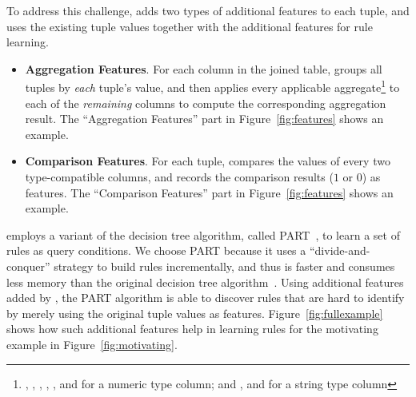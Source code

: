 To address this challenge, \ourtool adds two types of
additional features to each tuple, and uses
the existing tuple values together with the additional features
for rule learning.

\begin{itemize}

\item {\textbf{Aggregation Features}}. For each
column in the joined table, \ourtool 
groups all tuples by \textit{each} tuple's
value, and then applies every applicable aggregate\footnote{
, , ,
, , and  for a numeric type column;
and , and  for
a string type column} to each of the
 \textit{remaining} columns to compute the corresponding aggregation result. 
The ``Aggregation Features'' part in Figure~\ref{fig:features}
shows an example.

\item {\textbf{Comparison Features}}. For each tuple,
\ourtool compares
the values of every two type-compatible columns, and records
the comparison results ($1$ or $0$) as features.
The ``Comparison Features'' part in Figure~\ref{fig:features}
shows an example.

\end{itemize}



\ourtool employs a variant of the decision tree algorithm,
called PART~\cite{Frank:1998}, to learn a set of rules
as query conditions. We choose PART
because it uses a ``divide-and-conquer'' strategy to 
build rules incrementally, and thus is faster
and consumes less memory than
the original decision tree algorithm~\cite{Quinlan:1986}.
Using additional features added by \ourtool, the
PART algorithm is able to discover rules that are
hard to identify by merely using the original tuple values as features.
Figure~\ref{fig:fullexample} shows how such additional features
help in learning rules for the motivating
example in Figure~\ref{fig:motivating}.




